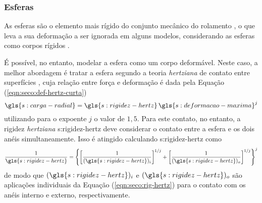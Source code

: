 \documentclass[12pt,oneside,english,brazil,lmodern,siglas,simbolos,cite=num]{ucsmonograph}
\begin{document}
	\subsubsection{Esferas}
	As esferas são o elemento mais rígido do conjunto mecânico do rolamento \cite{sassi:2007}, o que leva a sua deformação a ser ignorada em alguns modelos, considerando as esferas como corpos rígidos \cite{mcfadden:1984,tandon:1997,sassi:2007,cong:2013}.
	
	É possível, no entanto, modelar a esfera como um corpo deformável.
	Neste caso, a melhor abordagem é tratar a esfera segundo a teoria \emph{hertziana} de contato entre superfícies \cite{patil:2010}, cuja relação entre força e deformação é dada pela Equação (\ref{eqn:seco:def-hertz-curta})
	\begin{equation*}
		\gls{s:carga-radial} = \gls{s:rigidez-hertz}\,
		\gls{s:deformacao-maxima}^j
	\end{equation*}
	utilizando para o expoente $j$ o valor de $1,5$.
	Para este contato, no entanto, a rigidez \emph{hertziana} \gls{s:rigidez-hertz} deve considerar o contato entre a esfera e os dois anéis simultaneamente.
	Isso é atingido calculando \gls{s:rigidez-hertz} como \cite{patil:2010,hamrock:1991}
	\begin{equation}
		\frac{1}{\gls{s:rigidez-hertz}} = \left\lbrace \left[
		\frac{1}{(\gls{s:rigidez-hertz})_i} \right]^{1/j} + \left[
		\frac{1}{(\gls{s:rigidez-hertz})_o} \right]^{1/j}
		\right\rbrace^j
	\end{equation}
	de modo que $ (\gls{s:rigidez-hertz})_i $ e $ (\gls{s:rigidez-hertz})_o $ são aplicações individuais da Equação (\ref{eqn:seco:rig-hertz}) para o contato com os anéis interno e externo, respectivamente.
	
\end{document}
